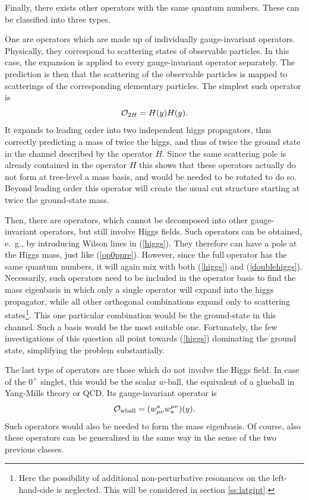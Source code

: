 \documentclass[final,12pt,3p,longtitle]{elsarticle}
\newcommand*{\no}{\noindent}
\newcommand*{\be}{\begin{equation}}
\newcommand*{\ee}{\end{equation}}
\newcommand*{\pref}[1]{(\ref{#1})}
\newcommand*{\mn}{{\mu\nu}}
\newcommand*{\1}{1\!\!\!\bot}
\newcommand*{\op}{{\cal O}}
\begin{document}
Finally, there exists other operators with the same quantum numbers. These can be classified into three types.

One are operators which are made up of individually gauge-invariant operators. Physically, they correspond to scattering states of observable particles. In this case, the expansion is applied to every gauge-invariant operator separately. The prediction is then that the scattering of the observable particles is mapped to scatterings of the corresponding elementary particles. The simplest such operator is
\be
{\cal O}_{2H}=H(y)H(y)\label{doublehiggs}.
\ee
\no It expands to leading order into two independent higgs propagators, thus correctly predicting a mass of twice the higgs, and thus of twice the ground state in the channel described by the operator $H$. Since the same scattering pole is already contained in the operator $H$ this shows that these operators actually do not form at tree-level a mass basis, and would be needed to be rotated to do so. Beyond leading order this operator will create the usual cut structure starting at twice the ground-state mass.

Then, there are operators, which cannot be decomposed into other gauge-invariant operators, but still involve Higgs fields. Such operators can be obtained, e.\ g., by introducing Wilson lines in \pref{higgs}. They therefore can have a pole at the Higgs mass, just like \pref{op0ppre}. However, since the full operator has the same quantum numbers, it will again mix with both \pref{higgs} and \pref{doublehiggs}. Necessarily, such operators need to be included in the operator basis to find the mass eigenbasis in which only a single operator will expand into the higgs propagator, while all other orthogonal combinations expand only to scattering states\footnote{Here the possibility of additional non-perturbative resonances on the left-hand-side is neglected. This will be considered in section \ref{ss:latgipt}.}. This one particular combination would be the ground-state in this channel. Such a basis would be the most suitable one. Fortunately, the few investigations of this question \cite{Maas:2013aia,Maas:2014pba,Wurtz:2013ova} all point towards \pref{higgs} dominating the ground state, simplifying the problem substantially.

The last type of operators are those which do not involve the Higgs field. In case of the $0^{+}$ singlet, this would be the scalar $w$-ball, the equivalent of a glueball in Yang-Mills theory or QCD. Its gauge-invariant operator is
\be
\op_\mathrm{wball}=(w_\mn^a w^\mn_a)(y)\label{wball}.
\ee
\no Such operators would also be needed to form the mass eigenbasis. Of course, also these operators can be generalized in the same way in the sense of the two previous classes.
\end{document}
